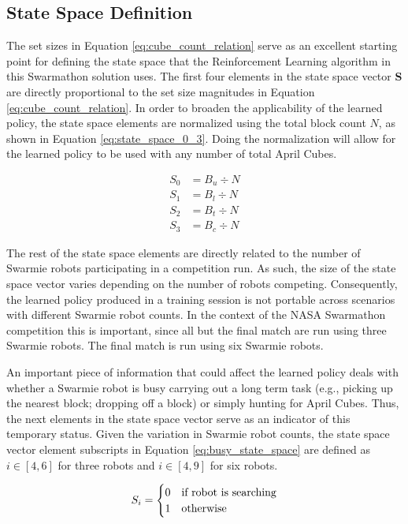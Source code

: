 \documentclass[sigconf,authordraft]{acmart}
\begin{document}
\subsection{State Space Definition}\label{subsec:state_space}
The set sizes in Equation \ref{eq:cube_count_relation} serve as an excellent starting point for defining the state space that the Reinforcement Learning algorithm in this Swarmathon solution uses. The first four elements in the state space vector \textbf{S} are directly proportional to the set size magnitudes in Equation \ref{eq:cube_count_relation}. In order to broaden the applicability of the learned policy, the state space elements are normalized using the total block count $N$, as shown in Equation \ref{eq:state_space_0_3}. Doing the normalization will allow for the learned policy to be used with any number of total April Cubes.

\begin{equation}\label{eq:state_space_0_3}
  \begin{aligned}
    S_0 &= B_u \div N \\
    S_1 &= B_l \div N \\
    S_2 &= B_t \div N \\
    S_3 &= B_c \div N
  \end{aligned}
\end{equation}

The rest of the state space elements are directly related to the number of Swarmie robots participating in a competition run. As such, the size of the state space vector varies depending on the number of robots competing. Consequently, the learned policy produced in a training session is not portable across scenarios with different Swarmie robot counts. In the context of the NASA Swarmathon competition this is important, since all but the final match are run using three Swarmie robots. The final match is run using six Swarmie robots.

An important piece of information that could affect the learned policy deals with whether a Swarmie robot is busy carrying out a long term task (e.g., picking up the nearest block; dropping off a block) or simply hunting for April Cubes. Thus, the next elements in the state space vector serve as an indicator of this temporary status. Given the variation in Swarmie robot counts, the state space vector element subscripts in Equation \ref{eq:busy_state_space} are defined as $i \in [4,6]$ for three robots and $i \in [4,9]$ for six robots.

\begin{equation}\label{eq:busy_state_space}
  S_i =
    \begin{cases}
      0 & \textup{if robot is searching} \\
      1 & \textup{otherwise}
    \end{cases}
\end{equation}
\end{document}
